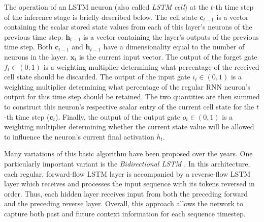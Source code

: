 \documentclass[preprint,review,10pt]{elsarticle}
\begin{document}
	The operation of an LSTM neuron (also called \textit{LSTM cell}) at the $t$-th time step of the inference stage is briefly described below. The cell state $\mathbf{c}_{t-1}$ is a vector containing the scalar stored state values from each of this layer's neurons of the previous time step. $\mathbf{h}_{t-1}$ is a vector containing the layer's outputs of the previous time step. Both $\mathbf{c}_{t-1}$ and $\mathbf{h}_{t-1}$ have a dimensionality equal to the number of neurons in the layer. $\mathbf{x}_{t}$ is the current input vector. The output of the forget gate $f_t \in (0, 1)$ is a weighting multiplier determining what percentage of the received cell state should be discarded. The output of the input gate $i_t \in (0, 1)$ is a weighting multiplier determining what percentage of the regular RNN neuron's output for this time step should be retained. The two quantities are then summed to construct this neuron's respective scalar entry of the current cell state for the $t$-th time step ($\mathbf{c}_{t}$). Finally, the output of the output gate $o_t \in (0, 1)$ is a weighting multiplier determining whether the current state value will be allowed to influence the neuron's current final activation $h_t$.
	
	Many variations of this basic algorithm have been proposed over the years. One particularly important variant is the \textit{Bidirectional LSTM} \cite{biLSTM}. In this architecture, each regular, forward-flow LSTM layer is accompanied by a reverse-flow LSTM layer which receives and processes the input sequence with its tokens reversed in order. Thus, each hidden layer receives input from both the preceding forward and the preceding reverse layer. Overall, this approach allows the network to capture both past and future context information for each sequence timestep.
	
\end{document}
